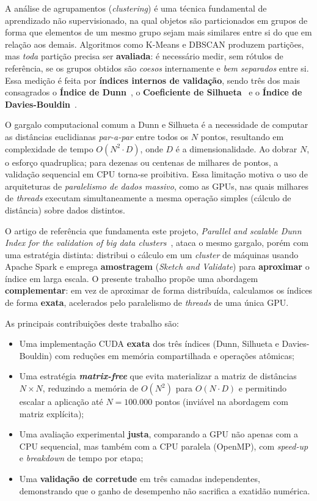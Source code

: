 \documentclass[12pt]{article}
\begin{document}
A análise de agrupamentos (\emph{clustering}) é uma técnica fundamental de
aprendizado não supervisionado, na qual objetos são particionados em grupos
de forma que elementos de um mesmo grupo sejam mais similares entre si do que
em relação aos demais. Algoritmos como K-Means e DBSCAN produzem partições,
mas \emph{toda} partição precisa ser \textbf{avaliada}: é necessário medir,
sem rótulos de referência, se os grupos obtidos são \emph{coesos}
internamente e \emph{bem separados} entre si. Essa medição é feita por
\textbf{índices internos de validação}, sendo três dos mais consagrados o
\textbf{Índice de Dunn}~\cite{dunn1974}, o \textbf{Coeficiente de
Silhueta}~\cite{rousseeuw1987} e o \textbf{Índice de
Davies-Bouldin}~\cite{davies1979}.

O gargalo computacional comum a Dunn e Silhueta é a necessidade de computar
as distâncias euclidianas \emph{par-a-par} entre todos os $N$ pontos,
resultando em complexidade de tempo $O(N^2 \cdot D)$, onde $D$ é a
dimensionalidade. Ao dobrar $N$, o esforço quadruplica; para dezenas ou
centenas de milhares de pontos, a validação sequencial em CPU torna-se
proibitiva. Essa limitação motiva o uso de arquiteturas de
\emph{paralelismo de dados massivo}, como as GPUs, nas quais milhares de
\emph{threads} executam simultaneamente a mesma operação simples (cálculo de
distância) sobre dados distintos.

O artigo de referência que fundamenta este projeto,
\emph{Parallel and scalable Dunn Index for the validation of big data
clusters}~\cite{ncir2021}, ataca o mesmo gargalo, porém com uma estratégia
distinta: distribui o cálculo em um \emph{cluster} de máquinas usando Apache
Spark e emprega \textbf{amostragem} (\emph{Sketch and Validate}) para
\textbf{aproximar} o índice em larga escala. O presente trabalho propõe uma
abordagem \textbf{complementar}: em vez de aproximar de forma distribuída,
calculamos os índices de forma \textbf{exata}, acelerados pelo paralelismo
de \emph{threads} de uma única GPU.

As principais contribuições deste trabalho são:
\begin{itemize}
  \item Uma implementação CUDA \textbf{exata} dos três índices (Dunn,
  Silhueta e Davies-Bouldin) com reduções em memória compartilhada e
  operações atômicas;
  \item Uma estratégia \textbf{\emph{matrix-free}} que evita materializar a
  matriz de distâncias $N\times N$, reduzindo a memória de $O(N^2)$ para
  $O(N\cdot D)$ e permitindo escalar a aplicação até $N=100.000$ pontos
  (inviável na abordagem com matriz explícita);
  \item Uma avaliação experimental \textbf{justa}, comparando a GPU não
  apenas com a CPU sequencial, mas também com a CPU paralela (OpenMP), com
  \emph{speed-up} e \emph{breakdown} de tempo por etapa;
  \item Uma \textbf{validação de corretude} em três camadas independentes,
  demonstrando que o ganho de desempenho não sacrifica a exatidão numérica.
\end{itemize}
\end{document}
